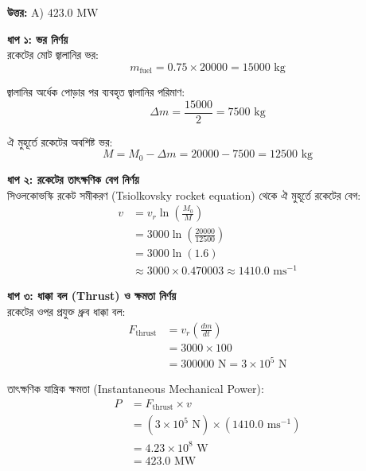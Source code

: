 \documentclass[12pt, a4paper]{article}
\begin{document}
\vspace{0.5em}
\begin{tcolorbox}[answerbox]
    \textbf{\color{success} উত্তর:} A) $423.0\text{ MW}$
\end{tcolorbox}
\vspace{1em}

\begin{tcolorbox}[solutionbox={সমাধান (Solution)}]
    \noindent
    \textbf{ধাপ ১: ভর নির্ণয়} \\
    রকেটের মোট জ্বালানির ভর:
    \[ m_{\text{fuel}} = 0.75 \times 20000 = 15000\text{ kg} \]
    
    জ্বালানির অর্ধেক পোড়ার পর ব্যবহৃত জ্বালানির পরিমাণ:
    \[ \Delta m = \frac{15000}{2} = 7500\text{ kg} \]
    
    ঐ মুহূর্তে রকেটের অবশিষ্ট ভর:
    \[ M = M_0 - \Delta m = 20000 - 7500 = 12500\text{ kg} \]
    
    \vspace{0.5em}
    \noindent\textbf{ধাপ ২: রকেটের তাৎক্ষণিক বেগ নির্ণয়} \\
    সিওলকোভস্কি রকেট সমীকরণ (Tsiolkovsky rocket equation) থেকে ঐ মুহূর্তে রকেটের বেগ:
    \begin{align*}
        v &= v_r \ln\left(\frac{M_0}{M}\right) \\
          &= 3000 \ln\left(\frac{20000}{12500}\right) \\
          &= 3000 \ln(1.6) \\
          &\approx 3000 \times 0.470003 \approx 1410.0\text{ ms}^{-1}
    \end{align*}
    
    \vspace{0.5em}
    \noindent\textbf{ধাপ ৩: ধাক্কা বল (Thrust) ও ক্ষমতা নির্ণয়} \\
    রকেটের ওপর প্রযুক্ত ধ্রুব ধাক্কা বল:
    \begin{align*}
        F_{\text{thrust}} &= v_r \left(\frac{dm}{dt}\right) \\
                          &= 3000 \times 100 \\
                          &= 300000\text{ N} = 3 \times 10^5\text{ N}
    \end{align*}
    
    তাৎক্ষণিক যান্ত্রিক ক্ষমতা (Instantaneous Mechanical Power):
    \begin{align*}
        P &= F_{\text{thrust}} \times v \\
          &= (3 \times 10^5\text{ N}) \times (1410.0\text{ ms}^{-1}) \\
          &= 4.23 \times 10^8\text{ W} \\
          &= \mathbf{423.0}\text{ MW}
    \end{align*}
\end{tcolorbox}
\end{document}
